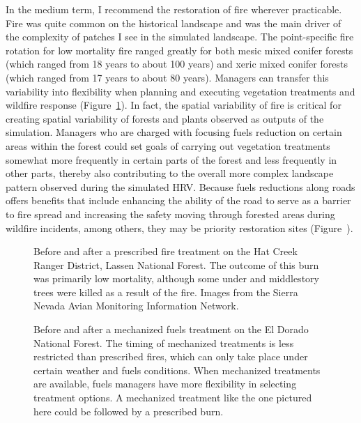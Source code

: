 In the medium term, I recommend the restoration of fire wherever practicable. Fire was quite common on the historical landscape and was the main driver of the complexity of patches I see in the simulated landscape. The point-specific fire rotation for low mortality fire ranged greatly for both mesic mixed conifer forests (which ranged from 18 years to about 100 years) and xeric mixed conifer forests (which ranged from 17 years to about 80 years). Managers can transfer this variability into flexibility when planning and executing vegetation treatments and wildfire response (Figure~\ref{fig:pfire_comp_HCRD}). In fact, the spatial variability of fire is critical for creating spatial variability of forests and plants observed as outputs of the simulation. Managers who are charged with focusing fuels reduction on certain areas within the forest could set goals of carrying out vegetation treatments somewhat more frequently in certain parts of the forest and less frequently in other parts, thereby also contributing to the overall more complex landscape pattern observed during the simulated HRV. Because fuels reductions along roads offers benefits that include enhancing the ability of the road to serve as a barrier to fire spread and increasing the safety moving through forested areas during wildfire incidents, among others, they may be priority restoration sites (Figure~). 

\begin{figure}[!htbp]
  \centering
  \caption{Before and after a prescribed fire treatment on the Hat Creek Ranger District, Lassen National Forest. The outcome of this burn was primarily low mortality, although some under and middlestory trees were killed as a result of the fire. Images from the Sierra Nevada Avian Monitoring Information Network.} 
  \label{fig:pfire_comp_HCRD}
\end{figure}

\begin{figure}[!htbp]
  \centering
  \caption{Before and after a mechanized fuels treatment on the El Dorado National Forest. The timing of mechanized treatments is less restricted than prescribed fires, which can only take place under certain weather and fuels conditions. When mechanized treatments are available, fuels managers have more flexibility in selecting treatment options. A mechanized treatment like the one pictured here could be followed by a prescribed burn.} 
  \label{fig:pfire_comp_EDNF}
\end{figure}


